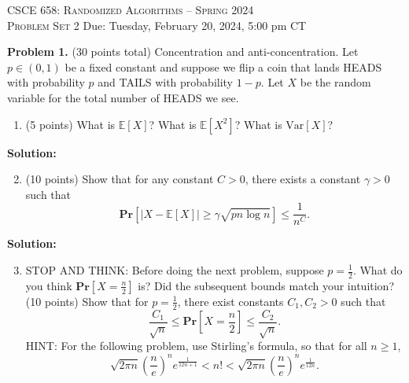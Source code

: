 \documentclass[11pt]{article}
\newcommand{\Ex}[1]{\ensuremath{\mathbb{E}\left[#1\right]}}
\newcommand{\Var}[1]{\ensuremath{\text{Var}\left[#1\right]}}
\newcommand{\PPr}[1]{\ensuremath{\mathbf{Pr}\left[#1\right]}}
\begin{document}
\begin{center}
{\Large\textsc{CSCE 658: Randomized Algorithms -- Spring 2024 \\ 
Problem Set 2}}
\vskip 0.1in
Due: Tuesday, February 20, 2024, 5:00 pm CT
\end{center}


\noindent
\textbf{Problem 1.} (30 points total)
Concentration and anti-concentration.
\vskip 0.1in\noindent
Let $p\in(0,1)$ be a fixed constant and suppose we flip a coin that lands HEADS with probability $p$ and TAILS with probability $1-p$. Let $X$ be the random variable for the total number of HEADS we see. 
\begin{enumerate}
\item (5 points)
What is $\Ex{X}$? What is $\Ex{X^2}$? What is $\Var{X}$?
\end{enumerate}

\noindent\textbf{Solution:}








\begin{enumerate}
\setcounter{enumi}{1}
\item (10 points)
Show that for any constant $C>0$, there exists a constant $\gamma>0$ such that 
\[\PPr{|X-\Ex{X}|\ge\gamma\sqrt{pn\log n}}\le\frac{1}{n^C}.\]
\end{enumerate}

\noindent\textbf{Solution:}






\begin{enumerate}
\setcounter{enumi}{2}
\item
STOP AND THINK: Before doing the next problem, suppose $p=\frac{1}{2}$. What do you think $\PPr{X=\frac{n}{2}}$ is? Did the subsequent bounds match your intuition?
\vskip 0.1in\noindent (10 points)
Show that for $p=\frac{1}{2}$, there exist constants $C_1,C_2>0$ such that
\[\frac{C_1}{\sqrt{n}}\le\PPr{X=\frac{n}{2}}\le\frac{C_2}{\sqrt{n}}.\]
\vskip 0.1in\noindent
HINT: For the following problem, use Stirling's formula, so that for all $n\ge 1$,
\[\sqrt{2\pi n}\left(\frac{n}{e}\right)^n e^{\frac{1}{12n+1}}<n!<\sqrt{2\pi n}\left(\frac{n}{e}\right)^n e^{\frac{1}{12n}}.\]
\end{enumerate}
\end{document}
